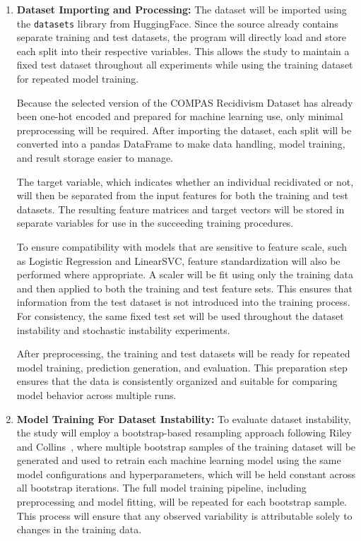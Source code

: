 \documentclass{article}
\begin{document}
\begin{enumerate}
  \item \textbf{Dataset Importing and Processing:}
  The dataset will be imported using the \texttt{datasets} library from HuggingFace. Since the source already contains separate training and test datasets, the program will directly load and store each split into their respective variables. This allows the study to maintain a fixed test dataset throughout all experiments while using the training dataset for repeated model training.

  Because the selected version of the COMPAS Recidivism Dataset has already been one-hot encoded and prepared for machine learning use, only minimal preprocessing will be required. After importing the dataset, each split will be converted into a pandas DataFrame to make data handling, model training, and result storage easier to manage.

  The target variable, which indicates whether an individual recidivated or not, will then be separated from the input features for both the training and test datasets. The resulting feature matrices and target vectors will be stored in separate variables for use in the succeeding training procedures.

  To ensure compatibility with models that are sensitive to feature scale, such as Logistic Regression and LinearSVC, feature standardization will also be performed where appropriate. A scaler will be fit using only the training data and then applied to both the training and test feature sets. This ensures that information from the test dataset is not introduced into the training process. For consistency, the same fixed test set will be used throughout the dataset instability and stochastic instability experiments.

  After preprocessing, the training and test datasets will be ready for repeated model training, prediction generation, and evaluation. This preparation step ensures that the data is consistently organized and suitable for comparing model behavior across multiple runs.

  \item \textbf{Model Training For Dataset Instability:}
  To evaluate dataset instability, the study will employ a bootstrap-based resampling approach following Riley and Collins~\cite{riley2023stability}, where multiple bootstrap samples of the training dataset will be generated and used to retrain each machine learning model using the same model configurations and hyperparameters, which will be held constant across all bootstrap iterations. The full model training pipeline, including preprocessing and model fitting, will be repeated for each bootstrap sample. This process will ensure that any observed variability is attributable solely to changes in the training data.


\end{enumerate}
\end{document}
